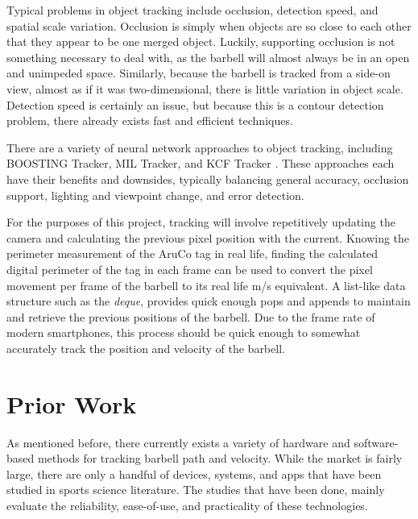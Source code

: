 \documentclass[10pt,twocolumn]{article}
\begin{document}
Typical problems in object tracking include occlusion, detection speed, and spatial scale variation.
Occlusion is simply when objects are so close to each other that they appear to be one merged object.
Luckily, supporting occlusion is not something necessary to deal with, as the barbell will almost always be in an open and unimpeded space.
Similarly, because the barbell is tracked from a side-on view, almost as if it was two-dimensional, there is little variation in object scale.
Detection speed is certainly an issue, but because this is a contour detection problem, there already exists fast and efficient techniques. \par

There are a variety of neural network approaches to object tracking, including BOOSTING Tracker, MIL Tracker, and KCF Tracker \cite{Grabner2006, Babenko2009, Henriques2015}.
These approaches each have their benefits and downsides, typically balancing general accuracy, occlusion support, lighting and viewpoint change, and error detection. \par

For the purposes of this project, tracking will involve repetitively updating the camera and calculating the previous pixel position with the current.
Knowing the perimeter measurement of the AruCo tag in real life, finding the calculated digital perimeter of the tag in each frame can be used to convert the pixel movement per frame of the barbell to its real life m/s equivalent.
A list-like data structure such as the \emph{deque}, provides quick enough pops and appends to maintain and retrieve the previous positions of the barbell.
Due to the frame rate of modern smartphones, this process should be quick enough to somewhat accurately track the position and velocity of the barbell. \par

\section{Prior Work}
As mentioned before, there currently exists a variety of hardware and software-based methods for tracking barbell path and velocity. 
While the market is fairly large, there are only a handful of devices, systems, and apps that have been studied in sports science literature.
The studies that have been done, mainly evaluate the reliability, ease-of-use, and practicality of these technologies. \par
\end{document}
